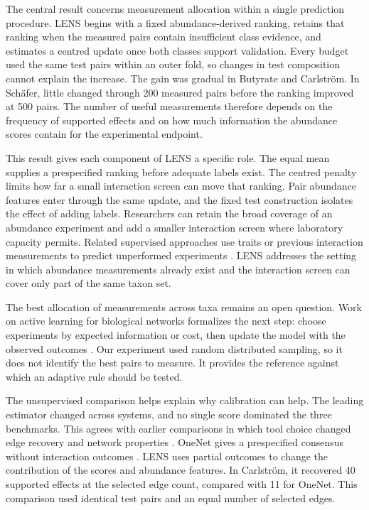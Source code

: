 \documentclass[11pt]{article}
\begin{document}
The central result concerns measurement allocation within a single prediction procedure.
LENS begins with a fixed abundance-derived ranking, retains that ranking when the measured pairs contain insufficient class evidence, and estimates a centred update once both classes support validation.
Every budget used the same test pairs within an outer fold, so changes in test composition cannot explain the increase.
The gain was gradual in Butyrate and Carlstr\"om.
In Sch\"afer, little changed through 200 measured pairs before the ranking improved at 500 pairs.
The number of useful measurements therefore depends on the frequency of supported effects and on how much information the abundance scores contain for the experimental endpoint.

This result gives each component of LENS a specific role.
The equal mean supplies a prespecified ranking before adequate labels exist.
The centred penalty limits how far a small interaction screen can move that ranking.
Pair abundance features enter through the same update, and the fixed test construction isolates the effect of adding labels.
Researchers can retain the broad coverage of an abundance experiment and add a smaller interaction screen where laboratory capacity permits.
Related supervised approaches use traits or previous interaction measurements to predict unperformed experiments \citep{dimucci2018missing,nestor2023growth}.
LENS addresses the setting in which abundance measurements already exist and the interaction screen can cover only part of the same taxon set.

The best allocation of measurements across taxa remains an open question.
Work on active learning for biological networks formalizes the next step: choose experiments by expected information or cost, then update the model with the observed outcomes \citep{sverchkov2017active}.
Our experiment used random distributed sampling, so it does not identify the best pairs to measure.
It provides the reference against which an adaptive rule should be tested.

The unsupervised comparison helps explain why calibration can help.
The leading estimator changed across systems, and no single score dominated the three benchmarks.
This agrees with earlier comparisons in which tool choice changed edge recovery and network properties \citep{weiss2016correlation,rottjers2018hairballs}.
OneNet gives a prespecified consensus without interaction outcomes \citep{champion2024onenet}.
LENS uses partial outcomes to change the contribution of the scores and abundance features.
In Carlstr\"om, it recovered 40 supported effects at the selected edge count, compared with 11 for OneNet.
This comparison used identical test pairs and an equal number of selected edges.
\end{document}
